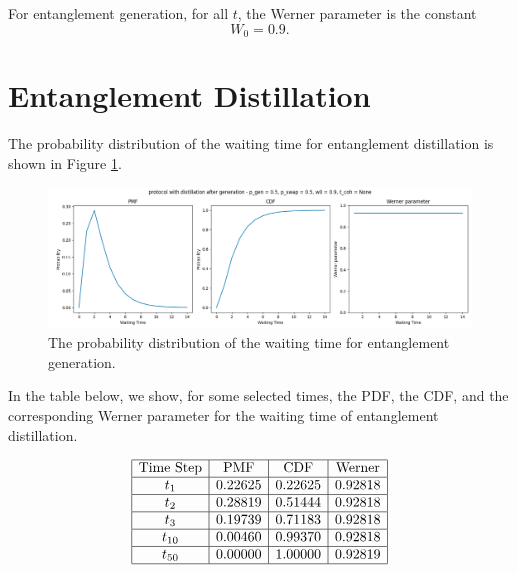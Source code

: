 \documentclass{masterthesis}
\begin{document}
For entanglement generation, for all $t$, the Werner parameter is the constant
\begin{equation}
    W_0 = 0.9 .
\end{equation}

\section*{Entanglement Distillation}

The probability distribution of the waiting time for entanglement distillation is shown in Figure \ref{fig:dist_waiting_time}.

\begin{figure}[ht]
    \centering
    \includegraphics[width=1\linewidth]{images/dist_tests/distillation after generation.png}
    \caption{The probability distribution of the waiting time for entanglement generation.}
    \label{fig:dist_waiting_time}
\end{figure}

In the table below, we show, for some selected times, the PDF, the CDF, and the corresponding Werner parameter for the waiting time of entanglement distillation.

\begin{equation*}
    \begin{array}{|c|c|c|c|}
        \hline
        \text{Time Step} & \text{PMF} & \text{CDF} & \text{Werner} \\
        \hline
        t_1 & 0.22625 & 0.22625 & 0.92818 \\
        \hline
        t_2 & 0.28819 & 0.51444 & 0.92818 \\
        \hline
        t_3 & 0.19739 & 0.71183 & 0.92818 \\
        \hline
        t_{10} & 0.00460 & 0.99370 & 0.92818 \\
        \hline
        t_{50} & 0.00000 & 1.00000 & 0.92819 \\
        \hline
    \end{array}
\end{equation*}
\end{document}
